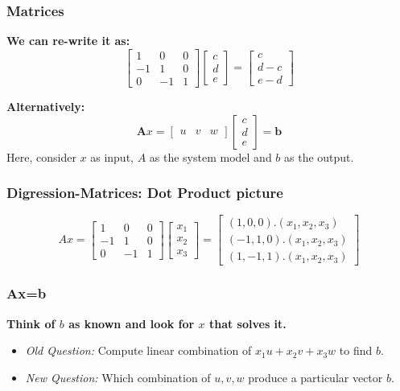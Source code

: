\documentclass{beamer}
\newtheorem{Key points}{Key points}
\begin{document}
 \begin{frame}
   \frametitle{Matrices}
   \textbf{We can re-write it as:}
\begin{equation*}
  \begin{bmatrix}
      1 & 0& 0\\
      -1 & 1 & 0\\
       0 & -1 & 1
     \end{bmatrix}
 \begin{bmatrix}
       c\\d\\e
     \end{bmatrix}=
       \begin{bmatrix}
        c\\d-c\\e-d
      \end{bmatrix}
    \end{equation*}

   \textbf{Alternatively:}
    \begin{equation*}
      \mathbf{A}x=
      \begin{bmatrix}
        u & v & w
      \end{bmatrix}
      \begin{bmatrix}
        c\\d\\e
      \end{bmatrix}=
        \mathbf{b}
    \end{equation*}
Here, consider $x$ as input, $A$ as the system model and $b$ as the output.
 \end{frame}
 \begin{frame}
   \frametitle{Digression-Matrices: Dot Product picture}
  \begin{equation*}
     Ax=   \begin{bmatrix}
      1 & 0& 0\\
      -1 & 1 & 0\\
       0 & -1 & 1
     \end{bmatrix}
     \begin{bmatrix}
       x_1\\x_2\\x_3
     \end{bmatrix}
=
\begin{bmatrix}
  (1,0,0).(x_1,x_2,x_3)\\
(-1,1,0).(x_1,x_2,x_3)\\
(1,-1,1).(x_1,x_2,x_3)
\end{bmatrix}
   \end{equation*}
 \end{frame}
 \begin{frame}
   \frametitle{Ax=b}
   \textbf{Think of $b$ as known and look for $x$ that solves it.}
   \begin{itemize}
   \item \emph{Old Question:} Compute linear combination of $x_1u + x_2v + x_3w$ to find $b$.
\item \emph{New Question:} Which combination of $u,v,w$ produce a particular vector $b$.
   \end{itemize}
 \end{frame}
\end{document}
